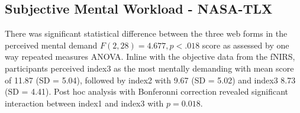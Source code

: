 \documentclass[../main/Feedback.tex]{subfiles}
\begin{document}
		
\subsection{Subjective Mental Workload - NASA-TLX}
There was significant statistical difference between the three web forms in the perceived mental demand $F(2,28)=4.677, p<.018$ score as assessed by one way repeated measures ANOVA. 
Inline with the objective data from the fNIRS, participants perceived index3 as the most mentally demanding with mean score of 11.87 (SD = 5.04), followed by index2 with 9.67 (SD = 5.02) and index3 8.73 (SD = 4.41).
Post hoc analysis with Bonferonni correction revealed significant interaction between index1 and index3 with $p=0.018$.
		
\end{document}
